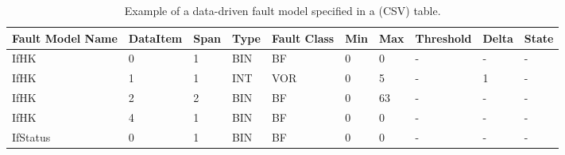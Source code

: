 \begin{table}[h]
\begin{center}
\small
\begin{tabular}{|p{1cm}|p{2cm}|p{1cm}|p{1cm}|p{1cm}|p{1cm}|p{1cm}|p{2cm}|p{1cm}|p{1cm}|}
\hline
\textbf{Fault Model Name}&\textbf{DataItem}&\textbf{Span}&\textbf{Type}&\textbf{Fault Class}&\textbf{Min}&\textbf{Max}&\textbf{Threshold}&\textbf{Delta}&\textbf{State}\\
\hline
IfHK&0&1&BIN&BF&0&0&-&-&-\\
IfHK&1&1&INT&VOR&0&5&-&1&-\\
IfHK&2&2&BIN&BF&0&63&-&-&-\\
IfHK&4&1&BIN&BF&0&0&-&-&-\\
\hline
IfStatus&0&1&BIN&BF&0&0&-&-&-\\
\hline
\end{tabular}
\end{center}
\caption{Example of a data-driven fault model specified in a (CSV) table.}
\label{table:faultModel:example}
\end{table}%
